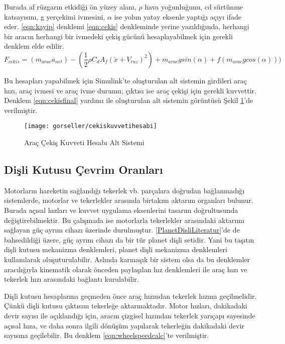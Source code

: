 Burada \acrshort{af} rüzgarın etkidiği ön yüzey alanı, $\rho$ hava yoğunluğunu, \acrshort{cd} sürtünme katsayısını, \acrshort{g} yerçekimi ivmesini, $\alpha$ ise yolun yatay eksenle yaptığı açıyı ifade eder. \ref{eqn:kayip} denklemi \ref{eqn:cekis} denkleminde yerine yazıldığında, herhangi bir aracın herhangi bir ivmedeki çekiş gücünü
hesaplayabilmek için gerekli denklem elde edilir. 
\begin{equation}
    F_{cekis}=(m_{arac}a_{net})-(\frac{1}{2}\rho C_dA_f(\dot{x}+V_{ruz})^2)+m_{arac}gsin(\alpha)+f(m_{arac}gcos(\alpha)))
    \label{eqn:cekisfinal}
\end{equation}

Bu hesapları yapabilmek için Simulink'te oluşturulan alt sistemin girdileri araç hızı, araç ivmesi ve araç ivme durumu; çıktısı ise
araç çekişi için gerekli kuvvettir. 
Denklem \ref{eqn:cekisfinal} yardımı ile oluşturulan alt sistemin görüntüsü Şekil \ref{fig:cekkuvhes}'de verilmiştir.
\begin{figure}[h]
    \centering
    \texttt{[image: gorseller/cekiskuvvetihesabi]}
    \caption{Araç Çekiş Kuvveti Hesabı Alt Sistemi}\label{fig:cekkuvhes}
\end{figure}

\subsection{Dişli Kutusu Çevrim Oranları }
\label{dislikutusucevrimoranlari}
Motorların hareketin sağlandığı tekerlek vb. parçalara doğrudan bağlanmadığı sistemlerde,
motorlar ve tekerlekler arasında birtakım aktarım organları bulunur. Burada açısal hızları ve kuvvet uygulama eksenlerini tasarım doğrultusunda değiştirebilmektir.
Bu çalışmada ise motorlarla tekerlekler arasındaki aktarımı sağlayan güç ayrım cihazı üzerinde durulmuştur.
\ref{PlanetDisliLiteratur}'de de bahsedildiği üzere, güç ayrım cihazı da bir tür planet dişli setidir. Yani bu taşıtın dişli kutusu mekanizma denklemleri,
planet dişli mekanizma denklemleri kullanılarak oluşuturulabilir. Aslında karmaşık bir sistem olsa da bu denklemler aracılığıyla kinematik olarak önceden paylaşılan hız denklemleri ile 
araç hızı ve tekerlek hızı arasındaki bağlantı kurulabilir.

Dişli kutusu hesaplarına geçmeden önce araç hızından tekerlek hızına geçilmelidir. Çünkü dişli kutusu çıktısını tekerleğe aktarmaktadır. Motor hızları, dakikadaki devir sayısı ile açıklandığı için, 
aracın çizgisel hızından tekerlek yarıçapı sayesinde açısal hıza, ve daha sonra ilgili dönüşüm yapılarak tekerleğin dakikadaki devir sayısına geçilebilir. Bu denklem \ref{eqn:wheelspeedcalc}'te verilmiştir.

